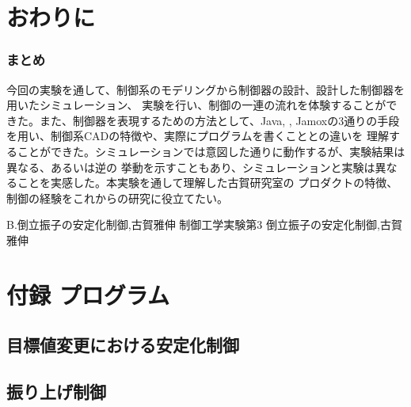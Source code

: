\chapter{おわりに}
\subsection{まとめ}
今回の実験を通して、制御系のモデリングから制御器の設計、設計した制御器を用いたシミュレーション、
実験を行い、制御の一連の流れを体験することができた。また、制御器を表現するための方法として、Java,
\MaTX{}, Jamoxの3通りの手段を用い、制御系CADの特徴や、実際にプログラムを書くこととの違いを
理解することができた。シミュレーションでは意図した通りに動作するが、実験結果は異なる、あるいは逆の
挙動を示すこともあり、シミュレーションと実験は異なることを実感した。本実験を通して理解した古賀研究室の
プロダクトの特徴、制御の経験をこれからの研究に役立てたい。

\begin{thebibliography}{2}
 B.倒立振子の安定化制御,古賀雅伸
 制御工学実験第3 倒立振子の安定化制御,古賀雅伸
\end{thebibliography}


\chapter{付録 プログラム}

\section{目標値変更における安定化制御}


\section{振り上げ制御}


